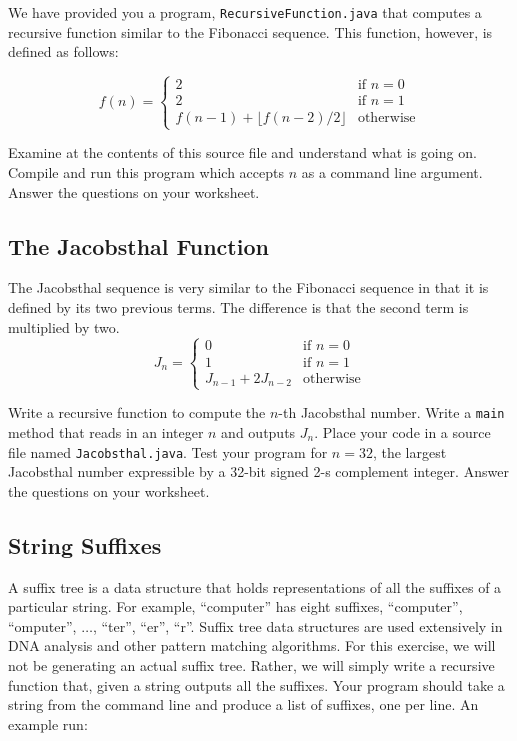 \documentclass[12pt]{scrartcl}
\begin{document}
We have provided you a program, \texttt{RecursiveFunction.java} 
that computes a recursive function similar to the Fibonacci sequence.  
This function, however, is defined as follows: 

$$f(n) = \left\{
\begin{array}{ll}
2 & \textrm{if } n = 0 \\
2 & \textrm{if } n = 1 \\
f(n-1) + \lfloor f(n-2) / 2 \rfloor & \textrm{otherwise}
\end{array}
\right.$$

Examine at the contents of this source file and understand what is 
going on.  Compile and run this program which accepts $n$ as a 
command line argument.  Answer the questions on your worksheet.

\subsection{The Jacobsthal Function}

The Jacobsthal sequence is very similar to the Fibonacci sequence 
in that it is defined by its two previous terms.  The difference is that 
the second term is multiplied by two.  
$$J_n = \left\{
\begin{array}{ll}
0 & \textrm{if } n = 0 \\
1 & \textrm{if } n = 1 \\
J_{n-1} + 2J_{n-2} & \textrm{otherwise}
\end{array}
\right.$$

Write a recursive function to compute the $n$-th Jacobsthal number.  
Write a \texttt{main} method that reads in an integer $n$ and 
outputs $J_n$.  Place your code in a source file named 
\texttt{Jacobsthal.java}.
Test your program for $n = 32$, the largest Jacobsthal 
number expressible by a 32-bit signed 2-s complement integer.  
Answer the questions on your worksheet.

\subsection{String Suffixes}

A suffix tree is a data structure that holds representations of all the 
suffixes of a particular string.  For example, ``computer'' has eight 
suffixes, ``computer'', ``omputer'', $\ldots$, ``ter'', ``er'', ``r''.  Suffix 
tree data structures are used extensively in DNA analysis and other 
pattern matching algorithms.  For this exercise, we will not be 
generating an actual suffix tree.  Rather, we will simply write a 
recursive function that, given a string outputs all the suffixes.  
Your program should take a string from the command line and 
produce a list of suffixes, one per line.  An example run: 
\end{document}
